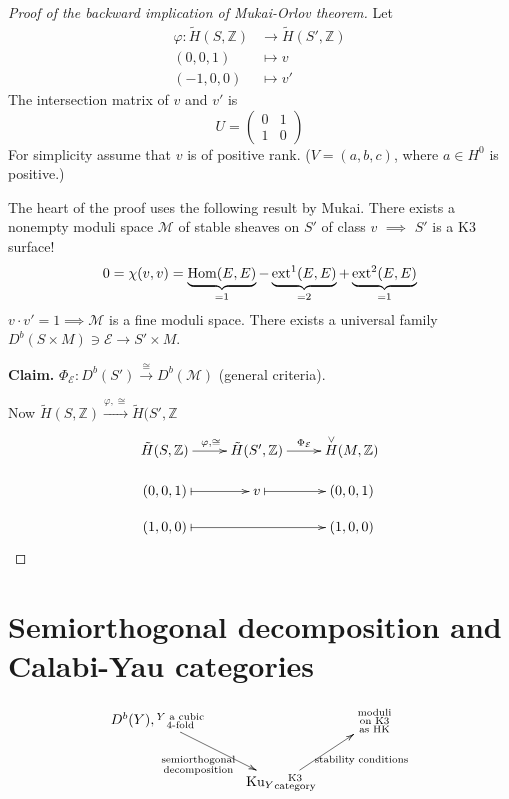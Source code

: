\begin{proof}[Proof of the backward
implication of Mukai-Orlov theorem]
Let
$$
\begin{aligned}
\varphi: \tilde{H}(S,\mathbb{Z})
&\longrightarrow \tilde{H}(S',\mathbb{Z}) \\
(0,0,1) &\longmapsto v\\
(-1,0,0) &\longmapsto v'
\end{aligned}
$$
The intersection matrix of $v$ and $v'$ is
$$
U=\begin{pmatrix}
0&1\\
1&0
\end{pmatrix}
$$
For simplicity assume that $v$ is of positive
rank. ($V=(a,b,c)$, where $a\in H^0$ is
positive.)

The heart of the proof uses the following
result by Mukai. There exists a nonempty
moduli space $\mathcal{M}$ of stable sheaves
on $S'$ of class $v$ $\implies$ $S'$ is a K3
surface!
$$
0=\chi(v,v)=\underbrace{\mathop{\mathrm{Hom}}\nolimits(E,E)}_{=1}
-\underbrace{\text{ext}^1(E,E)}_{=2}
+\underbrace{\text{ext}^2(E,E)}_{=1}
$$
$v\cdot v'=1\implies \mathcal{M}$ is a fine
moduli space. There exists a universal family
$D^b(S \times M)\ni \mathcal{E} \to S' \times
M$.

{\bf Claim.}
$\Phi_{\mathcal{E}}:D^b(S')
\xrightarrow{\cong}
D^b(\mathcal{M})$ (general criteria).

Now
$\tilde{H}(S,\mathbb{Z})\xrightarrow{\varphi,
\cong}
\tilde{H}(S',\mathbb{Z}$
$$
\xymatrix@R=1em{
\tilde{H}(S,\mathbb{Z})\ar[r]^{\varphi,\cong}
&
\tilde{H}(S',\mathbb{Z})
\ar[r]^{\Phi_{\mathcal{E}}}&\overset{\vee}{H}
(M,\mathbb{Z})\\
(0,0,1)\ar@{|->}[r]&  v \ar@{|->}[r]&
(0,0,1)\\
(1,0,0)\ar@{|->}[rr]& & (1,0,0)
}
$$
\end{proof}

\section{Semiorthogonal decomposition and
Calabi-Yau
categories}
\label{section-SOD-and-CY-categories}

\begin{situation}
\label{situation-SOD-and-SC}
$$
\xymatrix{
D^b(Y),\substack{Y\text{ a cubic} \\
\text{4-fold}}\ar[dr]
_{\substack{\text{semiorthogonal}
\\
\text{decomposition}}}
&  &\substack{\text{moduli}\\ \text{on K3} \\
\text{as HK}}\\
&\text{Ku}_Y\substack{\text{K3} \\
\text{category}}
\ar[ur]_{\text{stability conditions}}
}
$$
\end{situation}

